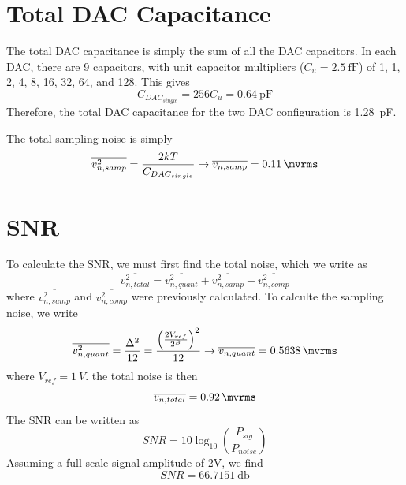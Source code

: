 \documentclass[letterpaper, notitlepage]{revtex4-1}
\begin{document}
\section{Total DAC Capacitance}
The total DAC capacitance is simply the sum of all the DAC capacitors. In each DAC, there are 9 capacitors, with unit capacitor multipliers ($C_u=\SI{2.5}{\femto\farad}$) of 1, 1, 2, 4, 8, 16, 32, 64, and 128. This gives
\begin{equation}
C_{DAC_{single}}=256C_u=\SI{0.64}{\pico\farad}
\end{equation}
Therefore, the total DAC capacitance for the two DAC configuration is \SI{1.28}{\pico\farad}.

The total sampling noise is simply
\begin{equation}
\overline{v_{n,samp}^2}=\frac{2kT}{C_{DAC_{single}}}\rightarrow\overline{v_{n,samp}}=\SI{0.11}{\mvrms}
\end{equation}


\section{SNR}
To calculate the SNR, we must first find the total noise, which we write as
\begin{equation}
\overline{v_{n,total}^2}=\overline{v_{n,quant}^2}+\overline{v_{n,samp}^2}+\overline{v_{n,comp}^2}
\end{equation}
where $\overline{v_{n,samp}^2}$ and $\overline{v_{n,comp}^2}$ were previously calculated. To calculte the sampling noise, we write
\begin{equation}
\overline{v_{n,quant}^2}=\frac{\Delta^2}{12}=\frac{\left(\frac{2V_{ref}}{2^B}\right)^2}{12}\rightarrow\overline{v_{n,quant}}=\SI{0.5638}{\mvrms}
\end{equation}
where $V_{ref}=\SI{1}{V}$. the total noise is then
\begin{equation}
\overline{v_{n,total}}=\SI{0.92}{\mvrms}
\end{equation}
The SNR can be written as
\begin{equation}
SNR=10\log_{10}\left(\frac{P_{sig}}{P_{noise}}\right)
\end{equation}
Assuming a full scale signal amplitude of 2V, we find
\begin{equation}
SNR=\SI{ 66.7151}{\decibel}
\end{equation}
\end{document}
